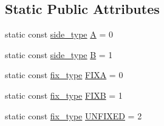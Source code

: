 \subsection*{Static Public Attributes}
\begin{DoxyCompactItemize}
\item 
static const \mbox{\hyperlink{classfm__partition_a7cdff1bea3740a287387e8408e16ca79}{side\+\_\+type}} \mbox{\hyperlink{classfm__partition_a738e75c601403754e61e6dac623fd3ab}{A}} = 0
\item 
static const \mbox{\hyperlink{classfm__partition_a7cdff1bea3740a287387e8408e16ca79}{side\+\_\+type}} \mbox{\hyperlink{classfm__partition_a42515c44eecb7ba3e2ec549a877ef238}{B}} = 1
\item 
static const \mbox{\hyperlink{classfm__partition_a63693cd93d587dca3d1842f831cd1c55}{fix\+\_\+type}} \mbox{\hyperlink{classfm__partition_a468a80e072d3ff18e5da33005825bcb1}{F\+I\+XA}} = 0
\item 
static const \mbox{\hyperlink{classfm__partition_a63693cd93d587dca3d1842f831cd1c55}{fix\+\_\+type}} \mbox{\hyperlink{classfm__partition_a0b9a66f0e8093ee83482f93d6aa5b2eb}{F\+I\+XB}} = 1
\item 
static const \mbox{\hyperlink{classfm__partition_a63693cd93d587dca3d1842f831cd1c55}{fix\+\_\+type}} \mbox{\hyperlink{classfm__partition_a24447561db0ea633212c597c5e1fca56}{U\+N\+F\+I\+X\+ED}} = 2
\end{DoxyCompactItemize}

